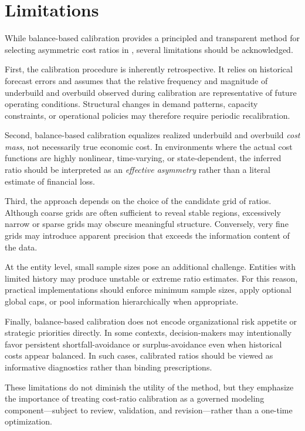 \section{Limitations}
\label{sec:limitations}

While balance-based calibration provides a principled and transparent method for
selecting asymmetric cost ratios in \CWSL{}, several limitations should be
acknowledged.

First, the calibration procedure is inherently retrospective.
It relies on historical forecast errors and assumes that the relative frequency
and magnitude of underbuild and overbuild observed during calibration are
representative of future operating conditions.
Structural changes in demand patterns, capacity constraints, or operational
policies may therefore require periodic recalibration.

Second, balance-based calibration equalizes realized underbuild and overbuild
\emph{cost mass}, not necessarily true economic cost.
In environments where the actual cost functions are highly nonlinear,
time-varying, or state-dependent, the inferred ratio should be interpreted as an
\emph{effective asymmetry} rather than a literal estimate of financial loss.

Third, the approach depends on the choice of the candidate grid of ratios.
Although coarse grids are often sufficient to reveal stable regions, excessively
narrow or sparse grids may obscure meaningful structure.
Conversely, very fine grids may introduce apparent precision that exceeds the
information content of the data.

At the entity level, small sample sizes pose an additional challenge.
Entities with limited history may produce unstable or extreme ratio estimates.
For this reason, practical implementations should enforce minimum sample sizes,
apply optional global caps, or pool information hierarchically when appropriate.

Finally, balance-based calibration does not encode organizational risk appetite
or strategic priorities directly.
In some contexts, decision-makers may intentionally favor persistent
shortfall-avoidance or surplus-avoidance even when historical costs appear
balanced.
In such cases, calibrated ratios should be viewed as informative diagnostics
rather than binding prescriptions.

These limitations do not diminish the utility of the method, but they emphasize
the importance of treating cost-ratio calibration as a governed modeling
component—subject to review, validation, and revision—rather than a one-time
optimization.
